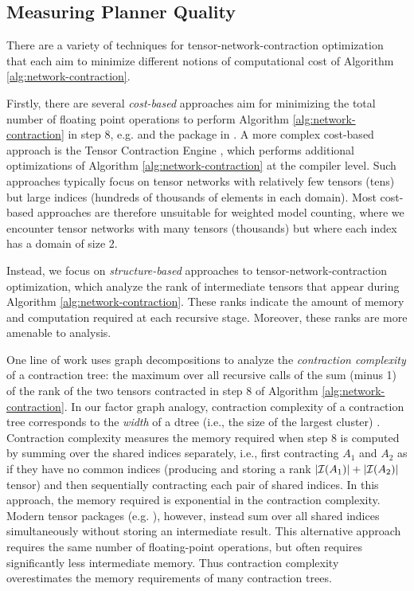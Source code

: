 \subsection{Measuring Planner Quality}
\label{sec:planning:quality}
There are a variety of techniques for tensor-network-contraction optimization that each aim to minimize different notions of computational cost of Algorithm \ref{alg:network-contraction}.

Firstly, there are several \emph{cost-based} approaches aim for minimizing the total number of floating point operations to perform Algorithm \ref{alg:network-contraction} in step 8, e.g. \cite{PHV14} and the  package in .  
A more complex cost-based approach is the Tensor Contraction Engine \cite{Hirata03}, which performs additional optimizations of Algorithm \ref{alg:network-contraction} at the compiler level. 
Such approaches typically focus on tensor networks with relatively few tensors (tens) but large indices (hundreds of thousands of elements in each domain).
Most cost-based approaches are therefore unsuitable for weighted model counting, where we encounter tensor networks with many tensors (thousands) but where each index has a domain of size 2.

Instead, we focus on \emph{structure-based} approaches to tensor-network-contraction optimization, which analyze the rank of intermediate tensors that appear during Algorithm \ref{alg:network-contraction}. 
These ranks indicate the amount of memory and computation required at each recursive stage. Moreover, these ranks are more amenable to analysis.

One line of work \cite{MS08,DFGHSW18} uses graph decompositions to analyze the \emph{contraction complexity} of a contraction tree: the maximum over all recursive calls of the sum (minus 1) of the rank of the two tensors contracted in step 8 of Algorithm \ref{alg:network-contraction}. In our factor graph analogy, contraction complexity of a contraction tree corresponds to the \emph{width} of a dtree (i.e., the size of the largest cluster) \cite{darwiche01b}.
Contraction complexity measures the memory required when step 8 is computed by summing over the shared indices separately, i.e., first contracting $A_1$ and $A_2$ as if they have no common indices (producing and storing a rank $|\mathcal{I}(A_1)|+|\mathcal{I}(A_2)|$ tensor) and then sequentially contracting each pair of shared indices. In this approach, the memory required is exponential in the contraction complexity. Modern tensor packages (e.g. ), however, instead sum over all shared indices simultaneously without storing an intermediate result. This alternative approach requires the same number of floating-point operations, but often requires significantly less intermediate memory. Thus contraction complexity overestimates the memory requirements of many contraction trees. 

